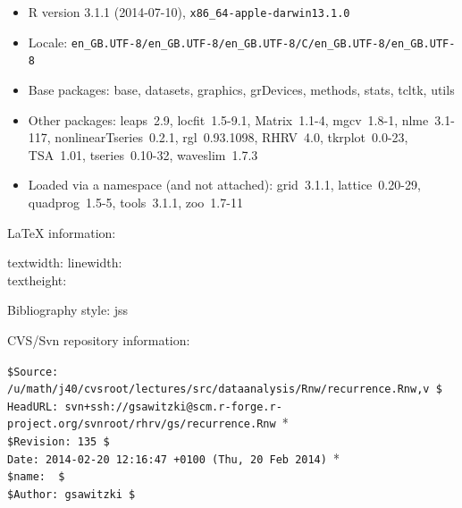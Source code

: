 \documentclass[a4paper, english, utf8]{amsart}
\begin{document}
{\tiny
\begin{itemize}\raggedright
  \item R version 3.1.1 (2014-07-10), \verb|x86_64-apple-darwin13.1.0|
  \item Locale: \verb|en_GB.UTF-8/en_GB.UTF-8/en_GB.UTF-8/C/en_GB.UTF-8/en_GB.UTF-8|
  \item Base packages: base, datasets, graphics, grDevices,
    methods, stats, tcltk, utils
  \item Other packages: leaps~2.9, locfit~1.5-9.1,
    Matrix~1.1-4, mgcv~1.8-1, nlme~3.1-117,
    nonlinearTseries~0.2.1, rgl~0.93.1098, RHRV~4.0,
    tkrplot~0.0-23, TSA~1.01, tseries~0.10-32, waveslim~1.7.3
  \item Loaded via a namespace (and not attached): grid~3.1.1,
    lattice~0.20-29, quadprog~1.5-5, tools~3.1.1, zoo~1.7-11
\end{itemize}}

\LaTeX{} information:
{\tiny

\currentpage 
textwidth: \prntlen{\textwidth} \qquad 
linewidth:\prntlen{\linewidth}\\
textheight: \prntlen{\textheight}\\
}

Bibliography style: jss

CVS/Svn repository information:

{\tiny%
\noindent
\verb+$Source: /u/math/j40/cvsroot/lectures/src/dataanalysis/Rnw/recurrence.Rnw,v $+\\
\verb*$HeadURL: svn+ssh://gsawitzki@scm.r-forge.r-project.org/svnroot/rhrv/gs/recurrence.Rnw $*\\
\verb+$Revision: 135 $+\\
\verb*$Date: 2014-02-20 12:16:47 +0100 (Thu, 20 Feb 2014) $*\\
\verb+$name:  $+\\
\verb+$Author: gsawitzki $+
}
\end{document}
